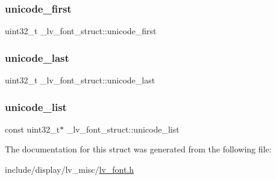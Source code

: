 \subsubsection{\texorpdfstring{unicode\_first}{unicode\_first}}
{\footnotesize\ttfamily uint32\+\_\+t \+\_\+lv\+\_\+font\+\_\+struct\+::unicode\+\_\+first}

\mbox{\label{struct__lv__font__struct_ae961ac0ee0c500debd41498a1df04bcf}} 
\subsubsection{\texorpdfstring{unicode\_last}{unicode\_last}}
{\footnotesize\ttfamily uint32\+\_\+t \+\_\+lv\+\_\+font\+\_\+struct\+::unicode\+\_\+last}

\mbox{\label{struct__lv__font__struct_a60f7312cda820564e63c2bc644bbc623}} 
\subsubsection{\texorpdfstring{unicode\_list}{unicode\_list}}
{\footnotesize\ttfamily const uint32\+\_\+t$\ast$ \+\_\+lv\+\_\+font\+\_\+struct\+::unicode\+\_\+list}



The documentation for this struct was generated from the following file\+:\begin{DoxyCompactItemize}
\item 
include/display/lv\+\_\+misc/\mbox{\hyperlink{lv__font_8h}{lv\+\_\+font.\+h}}\end{DoxyCompactItemize}
